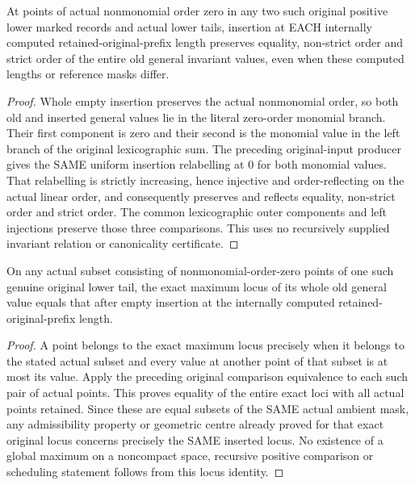 \begin{theorem}
\label{hir:member-future-order}
\leanok
At points of actual nonmonomial order zero in any two such original positive lower marked records and actual lower tails, insertion at EACH internally computed retained-original-prefix length preserves equality, non-strict order and strict order of the entire old general invariant values, even when these computed lengths or reference masks differ.
\end{theorem}
\begin{proof}
Whole empty insertion preserves the actual nonmonomial order, so both old and inserted general values lie in the literal zero-order monomial branch. Their first component is zero and their second is the monomial value in the left branch of the original lexicographic sum. The preceding original-input producer gives the SAME uniform insertion relabelling at $0$ for both monomial values. That relabelling is strictly increasing, hence injective and order-reflecting on the actual linear order, and consequently preserves and reflects equality, non-strict order and strict order. The common lexicographic outer components and left injections preserve those three comparisons. This uses no recursively supplied invariant relation or canonicality certificate.
\end{proof}

\begin{corollary}
\label{hir:member-future-centre}
\leanok
On any actual subset consisting of nonmonomial-order-zero points of one such genuine original lower tail, the exact maximum locus of its whole old general value equals that after empty insertion at the internally computed retained-original-prefix length.
\end{corollary}
\begin{proof}
A point belongs to the exact maximum locus precisely when it belongs to the stated actual subset and every value at another point of that subset is at most its value. Apply the preceding original comparison equivalence to each such pair of actual points. This proves equality of the entire exact loci with all actual points retained. Since these are equal subsets of the SAME actual ambient mask, any admissibility property or geometric centre already proved for that exact original locus concerns precisely the SAME inserted locus. No existence of a global maximum on a noncompact space, recursive positive comparison or scheduling statement follows from this locus identity.
\end{proof}
